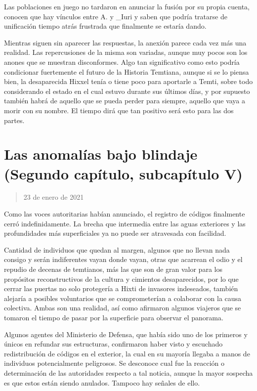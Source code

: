 \documentclass[
  spanish,
]{book}
\begin{document}
Las poblaciones en juego no tardaron en anunciar la fusión por su propia cuenta, conocen que hay vínculos entre A. y \_Iuri y saben que podría tratarse de unificación tiempo atrás frustrada que finalmente se estaría dando.

Mientras siguen sin aparecer las respuestas, la anexión parece cada vez más una realidad. Las repercusiones de la misma son variadas, aunque muy pocos son los anones que se muestran disconformes. Algo tan significativo como esto podría condicionar fuertemente el futuro de la Historia Temtiana, aunque si se lo piensa bien, la desaparecida Hixxel tenía o tiene poco para aportarle a Temti, sobre todo considerando el estado en el cual estuvo durante sus últimos días, y por supuesto también habrá de aquello que se pueda perder para siempre, aquello que vaya a morir con su nombre. El tiempo dirá que tan positivo será esto para las dos partes.

\hypertarget{las-anomaluxedas-bajo-blindaje-segundo-capuxedtulo-subcapuxedtulo-v}{%
\section{Las anomalías bajo blindaje (Segundo capítulo, subcapítulo V)}\label{las-anomaluxedas-bajo-blindaje-segundo-capuxedtulo-subcapuxedtulo-v}}

\begin{quote}
23 de enero de 2021
\end{quote}

Como las voces autoritarias habían anunciado, el registro de códigos finalmente cerró indefinidamente. La brecha que intermedia entre las aguas exteriores y las profundidades más superficiales ya no puede ser atravesada con facilidad.

Cantidad de individuos que quedan al margen, algunos que no llevan nada consigo y serán indiferentes vayan donde vayan, otras que acarrean el odio y el repudio de decenas de temtianos, más las que son de gran valor para los propósitos reconstructivos de la cultura y cimientos desaparecidos, por lo que cerrar las puertas no solo protegería a Hixti de invasores indeseados, también alejaría a posibles voluntarios que se comprometerían a colaborar con la causa colectiva. Ambas son una realidad, así como afirmaron algunos viajeros que se tomaron el tiempo de pasar por la superficie para observar el panorama.

Algunos agentes del Ministerio de Defensa, que había sido uno de los primeros y únicos en refundar sus estructuras, confirmaron haber visto y escuchado redistribución de códigos en el exterior, la cual en su mayoría llegaba a manos de individuos potencialmente peligrosos. Se desconoce cual fue la reacción o determinación de las autoridades respecto a tal noticia, aunque la mayor sospecha es que estos están siendo anulados. Tampoco hay señales de ello.
\end{document}
